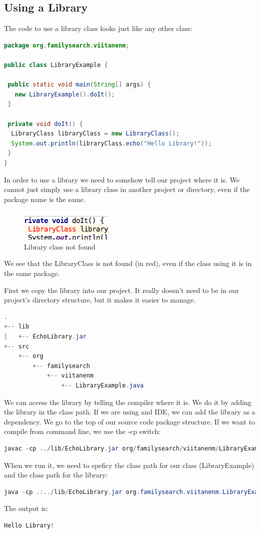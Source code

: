 \subsection{Using a Library}

The code to use a library class looks just like any other class:
\begin{lstlisting}[language=Java]
package org.familysearch.viitanenm;

public class LibraryExample {

 public static void main(String[] args) {
   new LibraryExample().doIt();
 }

 private void doIt() {
  LibraryClass libraryClass = new LibraryClass();
  System.out.println(libraryClass.echo("Hello Library!"));
 }
}
\end{lstlisting}

In order to use a library we need to somehow tell our project where it is. We cannot just simply use a library class in another project or directory, even if the package name is the same.

\begin{figure}[H]\centering
\includegraphics{images/library-error}
\caption{Library class not found}
\label{fig:libraryerror}
\end{figure}

We see that the LibraryClass is not found (in red), even if the class using it is in the same package. 

First we copy the library into our project. It really doesn't need to be in our project's directory structure, but it makes it easier to manage.

\begin{lstlisting}[language=Java]
.
+-- lib
|   +-- EchoLibrary.jar
+-- src
    +-- org
        +-- familysearch
            +-- viitanenm
                +-- LibraryExample.java
\end{lstlisting}

We can access the library by telling the compiler where it is. We do it by adding the library in the class path. If we are using and IDE, we can add the library as a dependency. We go to the top of our source code package structure. If we want to compile from command line, we use the -cp switch:

\begin{lstlisting}[language=Java]
javac -cp ../lib/EchoLibrary.jar org/familysearch/viitanenm/LibraryExample.java 
\end{lstlisting}

When we run it, we need to speficy the class path for our class (LibraryExample) and the class path for the library:
\begin{lstlisting}[language=Java]
java -cp .:../lib/EchoLibrary.jar org.familysearch.viitanenm.LibraryExample
\end{lstlisting}

The output is:
\begin{lstlisting}[language=Java]
Hello Library!
\end{lstlisting}
